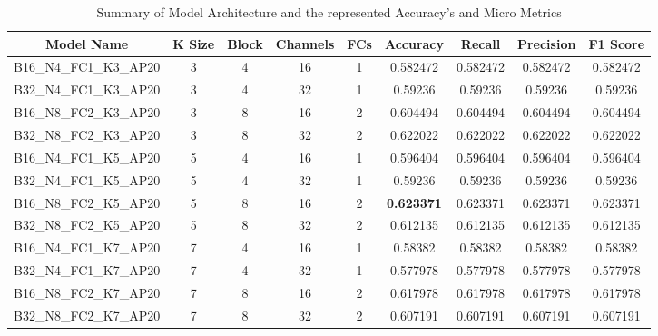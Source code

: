 \begin{table}[t]
	\caption{Summary of Model Architecture and the represented Accuracy's and Micro Metrics}
	\begin{tabular}{|c|c|c|c|c|c|c|c|c|}
		\hline
		Model Name & K Size & Block & Channels & FCs & Accuracy & Recall & Precision & F1 Score \\ \hline
		B16\_N4\_FC1\_K3\_AP20 & 3 & 4 & 16 & 1 & 0.582472 & 0.582472 & 0.582472 & 0.582472 \\ \hline
		B32\_N4\_FC1\_K3\_AP20 & 3 & 4 & 32 & 1 & 0.59236  & 0.59236 & 0.59236 & 0.59236 \\ \hline
		B16\_N8\_FC2\_K3\_AP20 & 3 & 8 & 16 & 2 & 0.604494 & 0.604494 & 0.604494 & 0.604494  \\ \hline
		B32\_N8\_FC2\_K3\_AP20 & 3 & 8 & 32 & 2 & 0.622022 & 0.622022 & 0.622022 & 0.622022 \\ \hline
		B16\_N4\_FC1\_K5\_AP20 & 5 & 4 & 16 & 1 & 0.596404 & 0.596404 & 0.596404 & 0.596404 \\ \hline
		B32\_N4\_FC1\_K5\_AP20 & 5 & 4 & 32 & 1 & 0.59236  & 0.59236 & 0.59236 & 0.59236 \\ \hline
		B16\_N8\_FC2\_K5\_AP20 & 5 & 8 & 16 & 2 & \textbf{0.623371} & 0.623371 & 0.623371 & 0.623371 \\ \hline
		B32\_N8\_FC2\_K5\_AP20 & 5 & 8 & 32 & 2 & 0.612135 & 0.612135 & 0.612135 & 0.612135 \\ \hline
		B16\_N4\_FC1\_K7\_AP20 & 7 & 4 & 16 & 1 & 0.58382  & 0.58382 & 0.58382 & 0.58382 \\ \hline
		B32\_N4\_FC1\_K7\_AP20 & 7 & 4 & 32 & 1 & 0.577978 & 0.577978 & 0.577978 & 0.577978 \\ \hline
		B16\_N8\_FC2\_K7\_AP20 & 7 & 8 & 16 & 2 & 0.617978 & 0.617978 & 0.617978 & 0.617978 \\ \hline
		B32\_N8\_FC2\_K7\_AP20 & 7 & 8 & 32 & 2 & 0.607191 & 0.607191 & 0.607191 & 0.607191 \\ \hline
	\end{tabular}
	\label{tab:results_micro}
	
	
\end{table}
